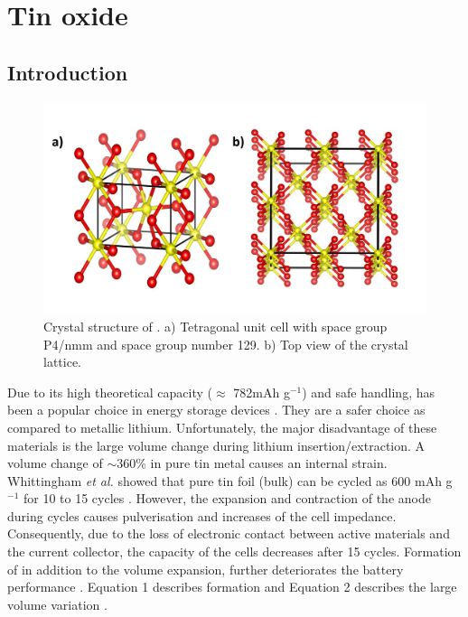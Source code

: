 \section{Tin oxide}

\subsection{Introduction}

\begin{figure}[th!]
  \centering
  \includegraphics[width=\textwidth]{Figures/chap6fig/SnO2crys}
    \caption{Crystal structure of . a) Tetragonal unit cell with space group P4/nmm and space group number 129. b) Top view of the crystal lattice.}
  \label{Figures/chap6fig:SnO2crys}
  \end{figure}
  
Due to its high theoretical capacity ($\approx$ 782mAh g$^{-1}$) and safe handling,  has been a popular choice in energy storage devices  \cite{idota_tin-based_1997}. They are a safer choice as compared to metallic lithium. Unfortunately, the major disadvantage of these materials is the large volume change during lithium insertion/extraction. A volume change of $\sim$360\% in pure tin metal causes an internal strain. Whittingham \textit{et al.} showed that pure tin foil (bulk) can be cycled as 600 mAh g$^{-1}$ for 10 to 15 cycles \cite{yang_anodes}. However, the expansion and contraction of the anode during cycles causes pulverisation and increases of the cell impedance. Consequently, due to the loss of electronic contact between active materials and the current collector, the capacity of the cells decreases after 15 cycles. Formation of  in addition to the volume expansion, further deteriorates the battery performance \cite{zhao_tin-based_2016}. Equation 1 describes  formation and Equation 2 describes the large volume variation \cite{park_effect_2008}.

